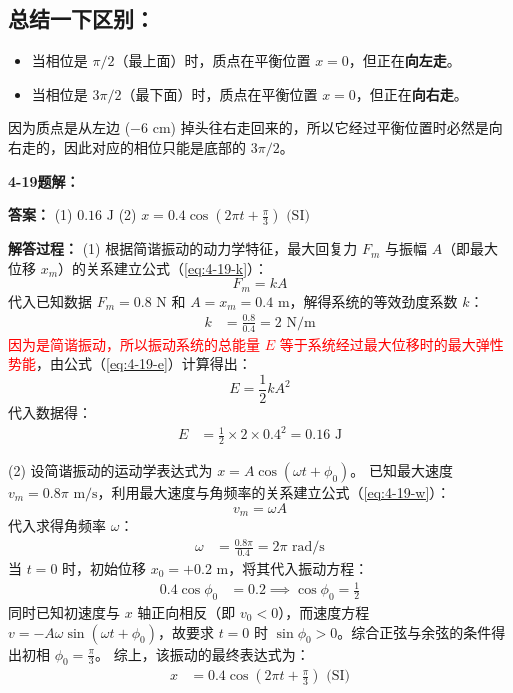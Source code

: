\subsection*{总结一下区别：}

\begin{itemize}
	\item 当相位是 $\pi/2$（最上面）时，质点在平衡位置 $x=0$，但正在\textbf{向左走}。
	\item 当相位是 $3\pi/2$（最下面）时，质点在平衡位置 $x=0$，但正在\textbf{向右走}。
\end{itemize}

因为质点是从左边 ($-6\text{ cm}$) 掉头往右走回来的，所以它经过平衡位置时必然是向右走的，因此对应的相位只能是底部的 $3\pi/2$。

\vspace{2em}

\textbf{4-19题解： }
\setcounter{equation}{0}
\renewcommand{\theHequation}{4-19.\arabic{equation}}

\textbf{答案： }
(1) $0.16 \text{ J}$
(2) $x = 0.4 \cos\left(2\pi t + \frac{\pi}{3}\right) \text{ (SI)}$

\textbf{解答过程： }
(1) 根据简谐振动的动力学特征，最大回复力 $F_m$ 与振幅 $A$（即最大位移 $x_m$）的关系建立公式（\ref{eq:4-19-k}）：
\begin{equation}\label{eq:4-19-k}
	F_m = k A
\end{equation}
代入已知数据 $F_m = 0.8 \text{ N}$ 和 $A = x_m = 0.4 \text{ m}$，解得系统的等效劲度系数 $k$：
\begin{align*}
	k &= \frac{0.8}{0.4} = 2 \text{ N/m}
\end{align*}
\textcolor{red}{因为是简谐振动，所以振动系统的总能量 $E$ 等于系统经过最大位移时的最大弹性势能}，由公式（\ref{eq:4-19-e}）计算得出：
\begin{equation}\label{eq:4-19-e}
	E = \frac{1}{2} k A^2
\end{equation}
代入数据得：
\begin{align*}
	E &= \frac{1}{2} \times 2 \times 0.4^2 = 0.16 \text{ J}
\end{align*}

(2) 设简谐振动的运动学表达式为 $x = A \cos(\omega t + \phi_0)$。
已知最大速度 $v_m = 0.8\pi \text{ m/s}$，利用最大速度与角频率的关系建立公式（\ref{eq:4-19-w}）：
\begin{equation}\label{eq:4-19-w}
	v_m = \omega A
\end{equation}
代入求得角频率 $\omega$：
\begin{align*}
	\omega &= \frac{0.8\pi}{0.4} = 2\pi \text{ rad/s}
\end{align*}
当 $t=0$ 时，初始位移 $x_0 = +0.2 \text{ m}$，将其代入振动方程：
\begin{align*}
	0.4 \cos\phi_0 &= 0.2 \implies \cos\phi_0 = \frac{1}{2}
\end{align*}
同时已知初速度与 $x$ 轴正向相反（即 $v_0 < 0$），而速度方程 $v = -A\omega \sin(\omega t + \phi_0)$，故要求 $t=0$ 时 $\sin\phi_0 > 0$。综合正弦与余弦的条件得出初相 $\phi_0 = \frac{\pi}{3}$。
综上，该振动的最终表达式为：
\begin{align*}
	x &= 0.4 \cos\left(2\pi t + \frac{\pi}{3}\right) \text{ (SI)}
\end{align*}

